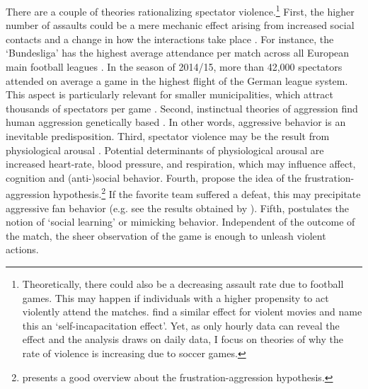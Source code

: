 \documentclass[11pt, a4paper]{article} %
\begin{document}
There are a couple of theories rationalizing spectator violence.\footnote{Theoretically, there could also be a decreasing assault rate due to football games. This may happen if individuals with a higher propensity to act violently attend the matches. \cite{dahl2009movie} find a similar effect for violent movies and name this an `self-incapacitation effect'. Yet, as only hourly data can reveal the effect and the analysis draws on daily data, I focus on theories of why the rate of violence is increasing due to soccer games.} First, the higher number of assaults could be a mere mechanic effect arising from increased social contacts and a change in how the interactions take place \citep{montolio2019measuring}. For instance, the `Bundesliga' has the highest average attendance per match across all European main football leagues \citep{wicker2017effect}. In the season of 2014/15, more than 42,000 spectators attended on average a game in the highest flight of the German league system. This aspect is particularly relevant for smaller municipalities, which attract thousands of spectators per game \citep{lindo2018college}. Second, instinctual theories of aggression find human aggression genetically based \citep{baron1977human}. In other words, aggressive behavior is an inevitable predisposition. Third, spectator violence may be the result from physiological arousal \citep{branscombe1992role}. Potential determinants of physiological arousal are increased heart-rate, blood pressure, and respiration, which may influence affect, cognition and (anti-)social behavior. Fourth, \cite{dollard1939frustration} propose the idea of the frustration-aggression hypothesis.\footnote{\cite{berkowitz1989frustration} presents a good overview about the frustration-aggression hypothesis.} If the favorite team suffered a defeat, this may precipitate aggressive fan behavior (e.g. see the results obtained by \cite{card2011family}). Fifth, \cite{bandura1973aggression, bandura2007social} postulates the notion of `social learning' or mimicking behavior. Independent of the outcome of the match, the sheer observation of the game is enough to unleash violent actions. 
\end{document}
